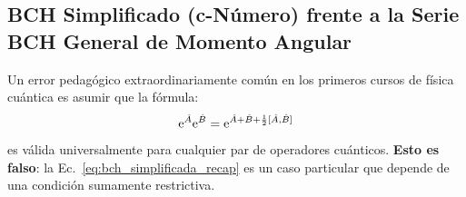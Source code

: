 \subsection{BCH Simplificado (c-Número) frente a la Serie BCH General de Momento Angular}
\label{subsec:bch_simplificado_vs_general}

Un error pedagógico extraordinariamente común en los primeros cursos de física cuántica es asumir que la fórmula:
\begin{equation}
    \mathrm{e}^{\hat{A}}\mathrm{e}^{\hat{B}} = \mathrm{e}^{\hat{A}+\hat{B} + \frac{1}{2}[\hat{A}, \hat{B}]}
    \label{eq:bch_simplificada_recap}
\end{equation}
es válida universalmente para cualquier par de operadores cuánticos. \textbf{Esto es falso}: la Ec.~\eqref{eq:bch_simplificada_recap} es un caso particular que depende de una condición sumamente restrictiva.


